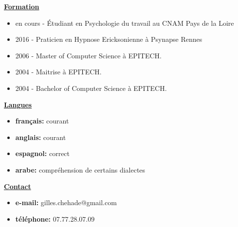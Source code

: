\documentclass[a4paper,10pt]{letter}
\begin{document}
\underline{\textbf{Formation}}\\
\begin{itemize}
\item en cours - \'Etudiant en Psychologie du travail au CNAM Pays de la Loire
\item 2016 - Praticien en Hypnose Ericksonienne \`a Psynapse Rennes
\item 2006 - Master of Computer Science \`a {EPITECH.}
\item 2004 - Maitrise \`a {EPITECH.}
\item 2004 - Bachelor of Computer Science \`a {EPITECH.}\\
\end{itemize}

\underline{\textbf{Langues}}\\
\begin{itemize}
\item	\textbf{fran\c cais:}	courant
\item	\textbf{anglais:}		courant
\item	\textbf{espagnol:}		correct
\item	\textbf{arabe:}			compr\'ehension de certains dialectes\\
\end{itemize}

\underline{\textbf{Contact}}\\
\begin{itemize}
\item	\textbf{e-mail:}	gilles.chehade@gmail.com
\item	\textbf{t\'el\'ephone:}	07.77.28.07.09
\end{itemize}

\pagebreak
\end{document}
